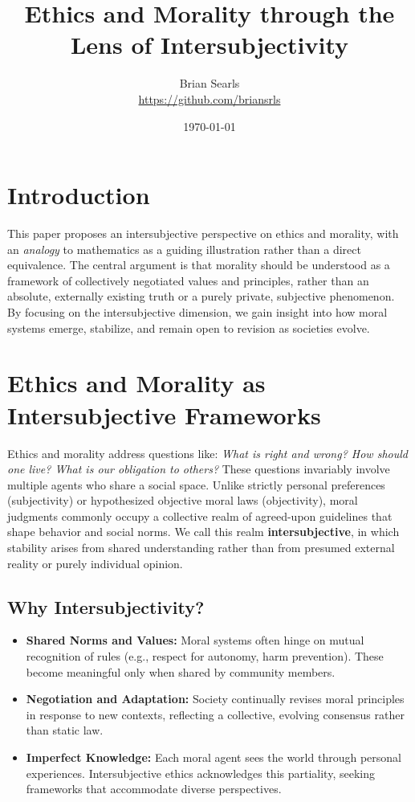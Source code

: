 \documentclass{article}
\title{Ethics and Morality through the Lens of Intersubjectivity}
\author{Brian Searls\\\href{https://github.com/briansrls}{https://github.com/briansrls}}
\date{\today}
\begin{document}
\maketitle

\section{Introduction}

This paper proposes an intersubjective perspective on ethics and morality, with an \emph{analogy} to mathematics as a guiding illustration rather than a direct equivalence. The central argument is that morality should be understood as a framework of collectively negotiated values and principles, rather than an absolute, externally existing truth or a purely private, subjective phenomenon. By focusing on the intersubjective dimension, we gain insight into how moral systems emerge, stabilize, and remain open to revision as societies evolve.

\section{Ethics and Morality as Intersubjective Frameworks}

Ethics and morality address questions like: \emph{What is right and wrong? How should one live? What is our obligation to others?} These questions invariably involve multiple agents who share a social space. Unlike strictly personal preferences (subjectivity) or hypothesized objective moral laws (objectivity), moral judgments commonly occupy a collective realm of agreed-upon guidelines that shape behavior and social norms. We call this realm \textbf{intersubjective}, in which stability arises from shared understanding rather than from presumed external reality or purely individual opinion.

\subsection{Why Intersubjectivity?}

\begin{itemize}
  \item \textbf{Shared Norms and Values:} Moral systems often hinge on mutual recognition of rules (e.g., respect for autonomy, harm prevention). These become meaningful only when shared by community members.
  \item \textbf{Negotiation and Adaptation:} Society continually revises moral principles in response to new contexts, reflecting a collective, evolving consensus rather than static law.
  \item \textbf{Imperfect Knowledge:} Each moral agent sees the world through personal experiences. Intersubjective ethics acknowledges this partiality, seeking frameworks that accommodate diverse perspectives.
\end{itemize}
\end{document}
